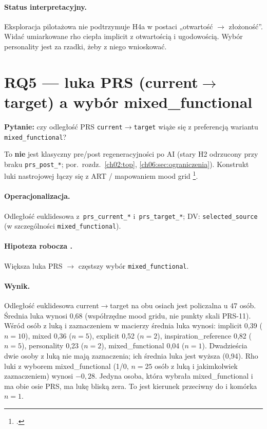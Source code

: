 \paragraph{Status interpretacyjny.}
Eksploracja pilotażowa nie podtrzymuje H4a w postaci „otwartość $\rightarrow$ złożoność”. Widać umiarkowane rho ciepła implicit z otwartością i ugodowością. Wybór personality jest za rzadki, żeby z niego wnioskować.

\section{RQ5 --- luka PRS (\texorpdfstring{current$\rightarrow$target}{current-target}) a wybór mixed\_functional}
\label{ch08:sec:rq5}

\textbf{Pytanie:} czy odległość PRS \texttt{current}$\rightarrow$\texttt{target} wiąże się z preferencją wariantu \texttt{mixed\_functional}?

To \textbf{nie} jest klasyczny pre/post regeneracyjności po AI (stary H2 odrzucony przy braku \texttt{prs\_post\_*}; por.\ rozdz.~\ref{ch02:top}, \ref{ch06:sec:ograniczenia}).
Konstrukt luki nastrojowej łączy się z ART / mapowaniem mood grid \footcite{kaplan1995restorative}.

\paragraph{Operacjonalizacja.}
Odległość euklidesowa z~\texttt{prs\_current\_*} i~\texttt{prs\_target\_*}; DV: \texttt{selected\_source} (w szczególności \texttt{mixed\_functional}).

\paragraph{Hipoteza robocza .}
Większa luka PRS $\rightarrow$ częstszy wybór \texttt{mixed\_functional}.

\paragraph{Wynik.}
Odległość euklidesowa current$\rightarrow$target na obu osiach jest policzalna u 47 osób. Średnia luka wynosi 0,68 (współrzędne mood gridu, nie punkty skali PRS-11).
Wśród osób z luką i zaznaczeniem w macierzy średnia luka wynosi: implicit 0,39 ($n=10$), mixed 0,36 ($n=5$), explicit 0,52 ($n=2$), inspiration\_reference 0,82 ($n=5$), personality 0,23 ($n=2$), mixed\_functional 0,04 ($n=1$). Dwadzieścia dwie osoby z luką nie mają zaznaczenia; ich średnia luka jest wyższa (0,94).
Rho luki z wyborem mixed\_functional (1/0, $n=25$ osób z luką i jakimkolwiek zaznaczeniem) wynosi $-0{,}28$. Jedyna osoba, która wybrała mixed\_functional i ma obie osie PRS, ma lukę bliską zera. To jest kierunek przeciwny do  i komórka $n=1$.

